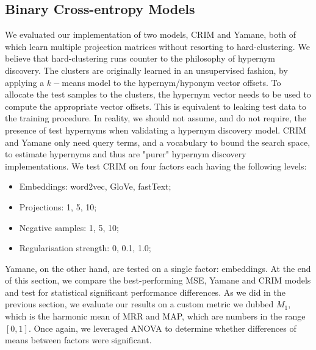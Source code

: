 \subsection{Binary Cross-entropy Models}
We evaluated our implementation of two models, CRIM and Yamane, both of which learn multiple projection matrices without resorting to hard-clustering.  We believe that hard-clustering runs counter to the philosophy of hypernym discovery.  The clusters are originally learned in an unsupervised fashion, by applying a $k-$means model to the hypernym/hyponym vector offsets.  To allocate the test samples to the clusters, the hypernym vector needs to be used to compute the appropriate vector offsets.  This is equivalent to leaking test data to the training procedure.  In reality, we should not assume, and do not require, the presence of test hypernyms when validating a hypernym discovery model.  CRIM and Yamane only need query terms, and a vocabulary to bound the search space, to estimate hypernyms and thus are "purer" hypernym discovery implementations.  We test CRIM on four factors each having the following levels:
\begin{itemize}
    \item Embeddings: word2vec, GloVe, fastText;
    \item Projections: 1, 5, 10;
    \item Negative samples: 1, 5, 10;
    \item Regularisation strength: 0, 0.1, 1.0;
\end{itemize}
Yamane, on the other hand, are tested on a single factor: embeddings.  At the end of this section, we compare the best-performing MSE, Yamane and CRIM models and test for statistical significant performance differences.  As we did in the previous section, we evaluate our results on a custom metric we dubbed $M_1$, which is the harmonic mean of \ac{MRR} and \ac{MAP}, which are numbers in the range $[0,1]$.  Once again, we leveraged \ac{ANOVA} to determine whether differences of means between factors were significant.

